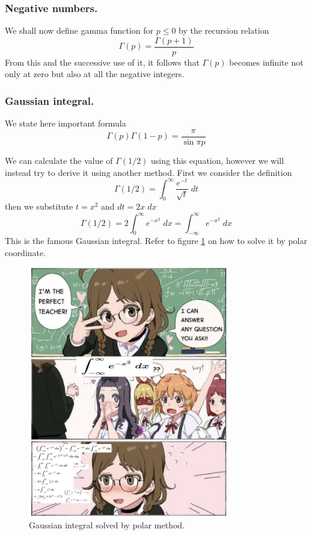 \documentclass[../../main.tex]{subfiles}
\begin{document}
\subsubsection*{Negative numbers.} We shall now deﬁne gamma function for $p\leq 0$ by the recursion 
relation 
\begin{equation*}
    \Gamma(p)=\frac{\Gamma(p+1)}{p}
\end{equation*}
From this and the successive use of it, it follows that $\Gamma(p)$ becomes infinite not only at zero but also at all the negative integers.

\subsubsection*{Gaussian integral.} We state here important formula
\begin{equation*}
    \Gamma(p)\Gamma(1-p)=\frac{\pi}{\sin \pi p}
\end{equation*}

We can calculate the value of $\Gamma(1/2)$ using this equation, however we will instead try to derive it using another method. First we consider the definition
\begin{equation*}
    \Gamma(1/2)=\int_{0}^{\infty}\frac{e^{-t}}{\sqrt{t}}\;dt
\end{equation*}
then we substitute $t=x^2$ and $dt=2x\;dx$
\begin{equation*}
    \Gamma(1/2)=2\int_{0}^{\infty}e^{-x^2}\;dx=\int_{-\infty}^{\infty}e^{-x^2}\;dx
\end{equation*}
This is the famous Gaussian integral. Refer to figure \ref{fig} on how to solve it by polar coordinate. 

\begin{figure}
    \centering
    \includegraphics[width=0.78\textwidth]{../../Rss/SFunc/9az27w9ge34e1.jpg}
    \caption{Gaussian integral solved by polar method.}
    \label{fig}
\end{figure}
\end{document}
